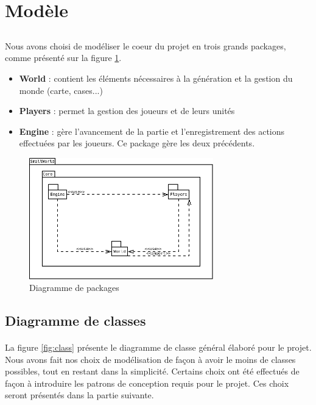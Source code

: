 \section{Modèle}

\subsection*{}

\paragraph{}
Nous avons choisi de modéliser le coeur du projet en trois grands packages, comme présenté sur la figure \ref{fig:packages}.

\begin{itemize}
  \item \textbf{World} : contient les éléments nécessaires à la génération et la gestion du monde (carte, cases...)
  \item \textbf{Players} : permet la gestion des joueurs et de leurs unités
  \item \textbf{Engine} : gère l'avancement de la partie et l'enregistrement des actions effectuées par les joueurs. Ce package gère les deux précédents.
\end{itemize}

\begin{figure}[h]
  \centering
  \includegraphics[width=8cm]{schemas/packages.png}
  \caption{Diagramme de packages}
  \label{fig:packages}
\end{figure}

\subsection{Diagramme de classes}

\paragraph{}
La figure \ref{fig:class} présente le diagramme de classe général élaboré pour le projet.
Nous avons fait nos choix de modélisation de façon à avoir le moins de classes possibles, tout en restant dans la simplicité.
Certains choix ont été effectués de façon à introduire les patrons de conception requis pour le projet. Ces choix seront présentés dans la partie suivante.

